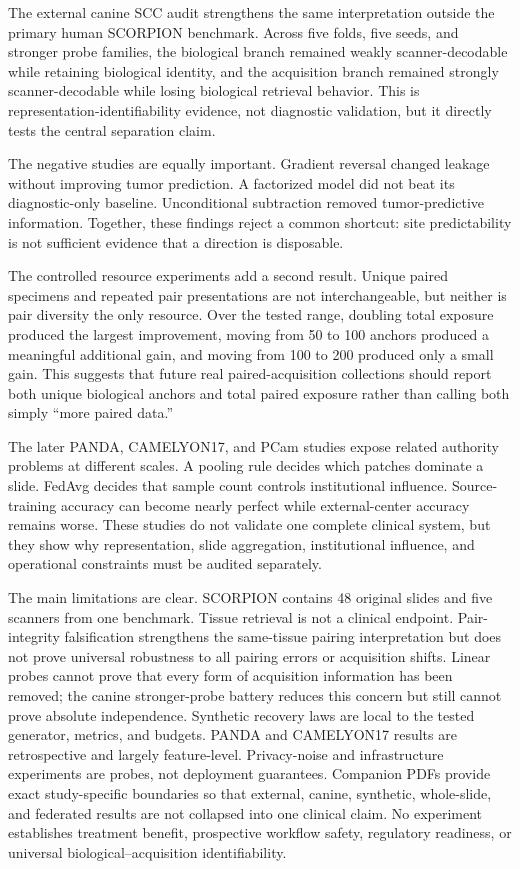 \documentclass[10pt]{article}
\begin{document}
The external canine SCC audit strengthens the same interpretation outside the primary human SCORPION benchmark. Across five folds, five seeds, and stronger probe families, the biological branch remained weakly scanner-decodable while retaining biological identity, and the acquisition branch remained strongly scanner-decodable while losing biological retrieval behavior. This is representation-identifiability evidence, not diagnostic validation, but it directly tests the central separation claim.

The negative studies are equally important. Gradient reversal changed leakage without improving tumor prediction. A factorized model did not beat its diagnostic-only baseline. Unconditional subtraction removed tumor-predictive information. Together, these findings reject a common shortcut: site predictability is not sufficient evidence that a direction is disposable.

The controlled resource experiments add a second result. Unique paired specimens and repeated pair presentations are not interchangeable, but neither is pair diversity the only resource. Over the tested range, doubling total exposure produced the largest improvement, moving from 50 to 100 anchors produced a meaningful additional gain, and moving from 100 to 200 produced only a small gain. This suggests that future real paired-acquisition collections should report both unique biological anchors and total paired exposure rather than calling both simply ``more paired data.''

The later PANDA, CAMELYON17, and PCam studies expose related authority problems at different scales. A pooling rule decides which patches dominate a slide. FedAvg decides that sample count controls institutional influence. Source-training accuracy can become nearly perfect while external-center accuracy remains worse. These studies do not validate one complete clinical system, but they show why representation, slide aggregation, institutional influence, and operational constraints must be audited separately.

The main limitations are clear. SCORPION contains 48 original slides and five scanners from one benchmark. Tissue retrieval is not a clinical endpoint. Pair-integrity falsification strengthens the same-tissue pairing interpretation but does not prove universal robustness to all pairing errors or acquisition shifts. Linear probes cannot prove that every form of acquisition information has been removed; the canine stronger-probe battery reduces this concern but still cannot prove absolute independence. Synthetic recovery laws are local to the tested generator, metrics, and budgets. PANDA and CAMELYON17 results are retrospective and largely feature-level. Privacy-noise and infrastructure experiments are probes, not deployment guarantees. Companion PDFs provide exact study-specific boundaries so that external, canine, synthetic, whole-slide, and federated results are not collapsed into one clinical claim. No experiment establishes treatment benefit, prospective workflow safety, regulatory readiness, or universal biological--acquisition identifiability.
\end{document}
